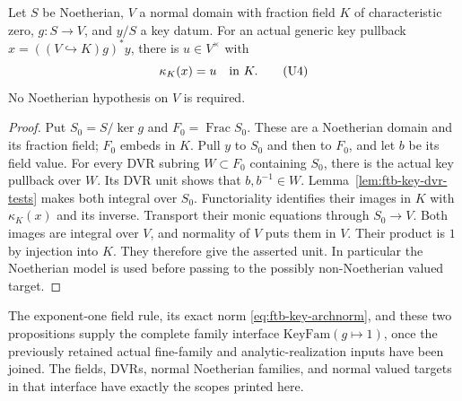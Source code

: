 \begin{srproposition}
\label{prop:ftb-key-normal-valued-unit}
Let \(S\) be Noetherian, \(V\) a normal domain with fraction
field \(K\) of characteristic zero, \(g:S\to V\), and
\(y/S\) a key datum.
For an actual generic key pullback
\(x=((V\hookrightarrow K)g)^*y\), there is \(u\in V^\times\)
with
\[
                                  \kappa_K(x)=u
                                  \quad\hbox{in }K.
 \tag{U4}\label{eq:ftb-key-valued-unit}
\]
No Noetherian hypothesis on \(V\) is required.
\end{srproposition}
\begin{proof}
Put \(S_0=S/\ker g\) and \(F_0=\operatorname{Frac}S_0\).
These are a Noetherian domain and its fraction field;
\(F_0\) embeds in \(K\).
Pull \(y\) to \(S_0\) and then to \(F_0\), and let \(b\)
be its field value.
For every DVR subring \(W\subset F_0\) containing \(S_0\),
there is the actual key pullback over \(W\).
Its DVR unit shows that \(b,b^{-1}\in W\).
Lemma~\ref{lem:ftb-key-dvr-tests} makes both integral over
\(S_0\).
Functoriality identifies their images in \(K\) with
\(\kappa_K(x)\) and its inverse.
Transport their monic equations through \(S_0\to V\).
Both images are integral over \(V\), and normality of
\(V\) puts them in \(V\).
Their product is \(1\) by injection into \(K\).
They therefore give the asserted unit.
In particular the Noetherian model is used before
passing to the possibly non-Noetherian valued target.
\end{proof}

The exponent-one field rule, its exact norm
\eqref{eq:ftb-key-archnorm}, and these two propositions
supply the complete family interface
\(\mathrm{KeyFam}(g\mapsto1)\), once the previously
retained actual fine-family and analytic-realization
inputs have been joined.
The fields, DVRs, normal Noetherian families, and normal
valued targets in that interface have exactly the scopes
printed here.

